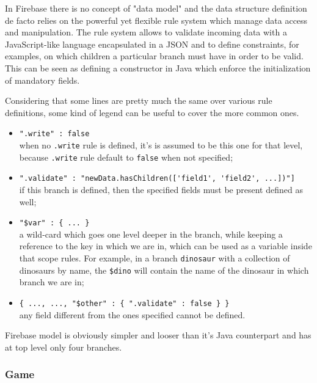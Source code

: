 			In Firebase there is no concept of "data model" and the data structure definition de facto relies on the powerful yet flexible rule system which manage data access and manipulation.
			The rule system allows to validate incoming data with a JavaScript-like language encapsulated in a JSON and to define constraints, for examples, on which children a particular branch must have in order to be valid. This can be seen as defining a constructor in Java which enforce the initialization of mandatory fields.
			
			Considering that some lines are pretty much the same over various rule definitions, some kind of legend can be useful to cover the more common ones.
			
			\begin{itemize}
				\item \lstinline|".write" : false| \\ when no \lstinline|.write| rule is defined, it's is assumed to be this one for that level, because \lstinline|.write| rule default to \lstinline|false| when not specified;
				\item \lstinline|".validate" : "newData.hasChildren(['field1', 'field2', ...])"]| \\ if this branch is defined, then the specified fields must be present defined as well;
				\item \lstinline|"$var" : { ... }| \\ a wild-card which goes one level deeper in the branch, while keeping a reference to the key in which we are in, which can be used as a variable inside that scope rules. For example, in a branch \lstinline|dinosaur| with a collection of dinosaurs by name, the \lstinline|$dino| will contain the name of the dinosaur in which branch we are in;
				\item \lstinline|{ ..., ..., "$other" : { ".validate" : false } }| \\ any field different from the ones specified cannot be defined.
			\end{itemize}
			
			Firebase model is obviously simpler and looser than it's Java counterpart and has at top level only four branches.
			
			
			\subsubsection{Game}
			
				
				
